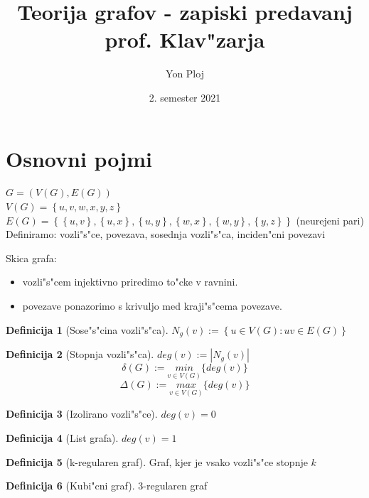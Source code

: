 \documentclass{article}
\theoremstyle{definition}
\newtheorem{definition}{Definicija}[section]
\begin{document}
	
	\title{Teorija grafov - zapiski predavanj prof. Klav"zarja}
	\author{Yon Ploj}
	\date{2. semester 2021}
	\maketitle
	
	
	\section{Osnovni pojmi}
	$ G = (V(G), E(G)) $ \\ 
	$ V(G) = \left\lbrace u, v, w, x, y, z\right\rbrace $ \\ 
	$ E(G) = \left\lbrace\left\lbrace u,v\right\rbrace, \left\lbrace u,x\right\rbrace, \left\lbrace u,y\right\rbrace, \left\lbrace w,x\right\rbrace, \left\lbrace w,y\right\rbrace, \left\lbrace y,z\right\rbrace\right\rbrace $ (neurejeni pari) \\ 
	Definiramo: vozli"s"ce, povezava, sosednja vozli"s"ca, inciden"cni povezavi
	
	Skica grafa:
	\begin{itemize}
		\item vozli"s"cem injektivno priredimo to"cke v ravnini.
		\item povezave ponazorimo s krivuljo med kraji"s"cema povezave.
	\end{itemize}
	
	\begin{definition}[Sose"s"cina vozli"s"ca]
		$N_g(v) := \left\lbrace u \in V(G): uv \in E(G)\right\rbrace$ %
	\end{definition}
	\begin{definition}[Stopnja vozli"s"ca]
		$deg(v) := |N_g(v)|$
		$$\delta(G) := \underset{v \in V(G)}{min} \lbrace deg(v) \rbrace $$
		$$\Delta(G) := \underset{v \in V(G)}{max} \lbrace deg(v) \rbrace $$		
	\end{definition}
	\begin{definition}[Izolirano vozli"s"ce]
		$deg(v) = 0$
	\end{definition}
	\begin{definition}[List grafa]
		$deg(v) = 1$
	\end{definition}
	\begin{definition} [k-regularen graf]
		Graf, kjer je vsako vozli"s"ce stopnje $k$
	\end{definition}
	\begin{definition} [Kubi"cni graf]
		3-regularen graf
	\end{definition}	
	
\end{document}

